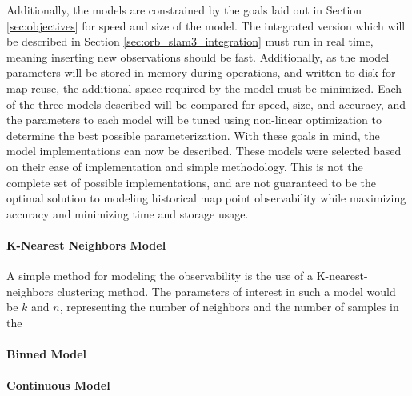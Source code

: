 Additionally, the models are constrained by the goals laid out in Section \ref{sec:objectives} for speed and size of the model. The integrated version which will be described in Section \ref{sec:orb_slam3_integration} must run in real time, meaning inserting new observations should be fast. Additionally, as the model parameters will be stored in memory during operations, and written to disk for map reuse, the additional space required by the model must be minimized. Each of the three models described will be compared for speed, size, and accuracy, and the parameters to each model will be tuned using non-linear optimization to determine the best possible parameterization. With these goals in mind, the model implementations can now be described. These models were selected based on their ease of implementation and simple methodology. This is not the complete set of possible implementations, and are not guaranteed to be the optimal solution to modeling historical map point observability while maximizing accuracy and minimizing time and storage usage.

\paragraph{K-Nearest Neighbors Model}
A simple method for modeling the observability is the use of a K-nearest-neighbors clustering method. The parameters of interest in such a model would be $k$ and $n$, representing the number of neighbors and the number of samples in the 
\paragraph{Binned Model}
\paragraph{Continuous Model}
